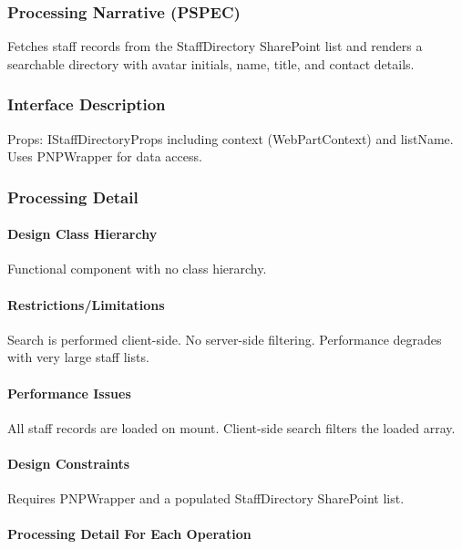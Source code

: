 \documentclass[12pt]{article}
\begin{document}
\subsubsection{Processing Narrative (PSPEC)}

Fetches staff records from the StaffDirectory SharePoint list and renders a searchable directory with avatar initials, name, title, and contact details.

\subsubsection{Interface Description}

Props: IStaffDirectoryProps including context (WebPartContext) and listName. Uses PNPWrapper for data access.

\subsubsection{Processing Detail}

\paragraph{Design Class Hierarchy}

Functional component with no class hierarchy.

\paragraph{Restrictions/Limitations}

Search is performed client-side. No server-side filtering. Performance degrades with very large staff lists.

\paragraph{Performance Issues}

All staff records are loaded on mount. Client-side search filters the loaded array.

\paragraph{Design Constraints}

Requires PNPWrapper and a populated StaffDirectory SharePoint list.

\paragraph{Processing Detail For Each Operation}
\end{document}
